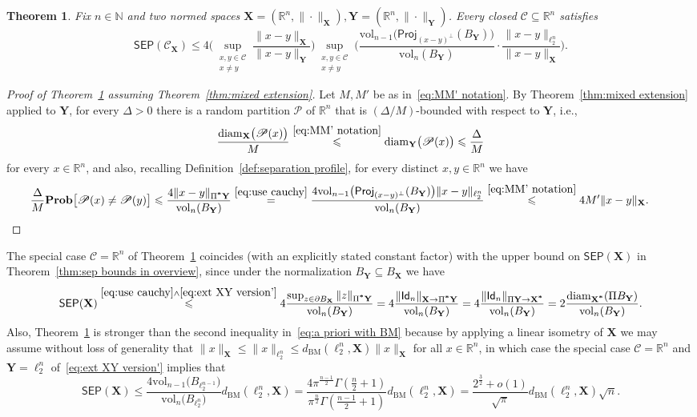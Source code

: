 \documentclass[11pt,reqno]{amsart}
\renewcommand{\le}{\leqslant}
\newcommand{\diam}{\mathrm{diam}}
\newcommand{\proj}{\mathsf{Proj}}
\newcommand{\X}{\mathbf X}
\newcommand{\Y}{\mathbf Y}
\newcommand{\R}{\mathbb R}
\newtheorem{theorem}{Theorem}
\theoremstyle{remark}
\newcommand{\Id}{\mathsf{Id}}
\renewcommand{\subset}{\subseteq}
\newcommand{\N}{\mathbb N}
\newcommand{\BM}{\mathrm{BM}}
\renewcommand{\Pr}{\mathbf{Prob}}
\newcommand{\sub}{\mathscr{C}}
\newcommand{\vol}{\mathrm{vol}}
\renewcommand{\1}{\mathbf 1}
\newcommand{\Part}{\mathscr{P}}
\newcommand{\sep}{\mathsf{SEP}}
\begin{document}
\begin{theorem}\label{thm:sep volume ratio-intro}Fix $n\in \N$ and two normed spaces $\X=(\R^n,\|\cdot\|_{\X}), \Y=(\R^n,\|\cdot\|_{\Y})$.  Every closed  $\sub\subset \R^n$ satisfies
\begin{equation}\label{eq:ext XY version'}
\sep(\sub_{\X})\le 4\bigg( \sup_{\substack{x,y\in \sub\\x\neq y}}\frac{\|x-y\|_{\X}}{\|x-y\|_{\Y}}\bigg)\sup_{\substack{x,y\in \sub\\x\neq y}} \bigg(\frac{\vol_{n-1}\big(\proj_{(x-y)^\perp}(B_{\Y})\big)}{\vol_n(B_{\Y})}\cdot \frac{\|x-y\|_{\ell_2^n}}{\|x-y\|_{\X}}\bigg).
\end{equation}
\end{theorem}

\begin{proof}[Proof of Theorem~\ref{thm:sep volume ratio-intro}  assuming Theorem~\ref{thm:mixed extension}] Let $M,M'$ be as in~\eqref{eq:MM' notation}. By Theorem~\ref{thm:mixed extension} applied to $\Y$, for every $\Delta>0$ there is a random partition $\Part$ of $\R^n$ that is $(\Delta/M)$-bounded with respect to $\Y$, i.e.,
$$
\frac{\diam_\X\big(\Part(x)\big)}{M}\stackrel{\eqref{eq:MM' notation}}{\le} \diam_\Y\big(\Part(x)\big)\le \frac{\Delta}{M}
$$
for every $x\in \R^n$, and also, recalling Definition~\ref{def:separation profile}, for every distinct  $x,y\in \R^n$ we have
\begin{equation*}
\frac{\Delta}{M}\Pr\big[\Part(x)\neq\Part(y)\big]\le  \frac{4\|x-y\|_{\Pi^{\textbf *}\Y}}{\vol_n(B_\Y)}\stackrel{\eqref{eq:use cauchy}}{=}\frac{4\vol_{n-1}\big(\proj_{(x-y)^\perp}(B_{\Y})\big)\|x-y\|_{\ell_2^n}}{\vol_n(B_{\Y})}\stackrel{\eqref{eq:MM' notation}}{\le} 4M'\|x-y\|_\X.\tag*{\qedhere}
\end{equation*}
\end{proof}


The special case $\sub=\R^n$ of Theorem~\ref{thm:sep volume ratio-intro}  coincides (with an explicitly stated constant factor) with the upper bound on $\sep(\X)$ in Theorem~\ref{thm:sep bounds in overview}, since under the normalization  $B_\Y\subset B_\X$ we have
$$
\sep(\X)\stackrel{\eqref{eq:use cauchy}\wedge \eqref{eq:ext XY version'}}{\le }4\frac{\sup_{z\in \partial B_{\X}}\|z\|_{\Pi^{\textbf *}\Y}}{\vol_n(B_\Y)}=4\frac{\|\Id_n\|_{\X\to\Pi^{\textbf *}\Y}}{\vol_n(B_\Y)}=4\frac{\|\Id_n\|_{\Pi\Y\to \X^{\textbf *}}}{\vol_n(B_\Y)}=2\frac{\diam_{\X^{\textbf *}}(\Pi B_\Y)}{\vol_n(B_\Y)}.
$$
Also, Theorem~\ref{thm:sep volume ratio-intro} is stronger than the second inequality in~\eqref{eq:a priori with BM} because by applying a linear isometry of  $\X$ we may assume without loss of generality that $\|x\|_{\X}\le \|x\|_{\ell_2^n}\le d_{\BM}(\ell_2^n,\X)\|x\|_{\X}$ for all $x\in \R^n$, in which case the special case $\sub=\R^n$ and $\Y=\ell_2^n$ of~\eqref{eq:ext XY version'} implies that
$$
\sep(\X)\le \frac{4\vol_{n-1}\big(B_{\ell_2^{n-1}}\big)}{\vol_n\big(B_{\ell_2^n}\big)}d_{\BM}(\ell_2^n,\X)= \frac{4\pi^{\frac{n-1}{2}}\Gamma\left(\frac{n}{2}+1\right)}{\pi^{\frac{n}{2}}\Gamma\left(\frac{n-1}{2}+1\right)} d_{\BM}(\ell_2^n,\X)=\frac{2^\frac32+o(1)}{\sqrt{\pi}} d_{\BM}(\ell_2^n,\X)\sqrt{n}.
$$
\end{document}
